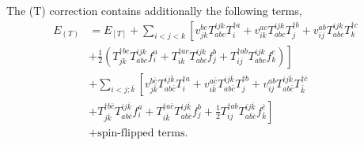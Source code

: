 \documentclass[a4paper,12pt,oneside]{book}
\newcommand{\spa}[1]{{#1}}
\newcommand{\spb}[1]{\bar{#1}}
\newcommand{\half}{\frac{1}{2}}
\begin{document}
The (T) correction contains additionally the following terms,
\begin{equation}
\begin{aligned}
\label{eq:Euccsd(t)}
E_{(T)}&=E_{[T]} 
+ \sum_{\spa{i}\lt\spa{j}\lt\spa{k}}\left[ 
v_{\spa{j}\spa{k}}^{\spa{b}\spa{c}} T_{\spa{a}\spa{b}\spa{c}}^{\spa{i}\spa{j}\spa{k}} T_{\spa{i}}^{\dagger \spa{a}} 
+v_{\spa{i}\spa{k}}^{\spa{a}\spa{c}} T_{\spa{a}\spa{b}\spa{c}}^{\spa{i}\spa{j}\spa{k}} T_{\spa{j}}^{\dagger \spa{b}} 
+v_{\spa{i}\spa{j}}^{\spa{a}\spa{b}} T_{\spa{a}\spa{b}\spa{c}}^{\spa{i}\spa{j}\spa{k}} T_{\spa{k}}^{\dagger \spa{c}} 
\right.\\
&\left.
 + \half\left( T_{\spa{j}\spa{k}}^{\dagger \spa{b}\spa{c}} T_{\spa{a}\spa{b}\spa{c}}^{\spa{i}\spa{j}\spa{k}} f_{\spa{i}}^{\spa{a}}
 + T_{\spa{i}\spa{k}}^{\dagger \spa{a}\spa{c}} T_{\spa{a}\spa{b}\spa{c}}^{\spa{i}\spa{j}\spa{k}} f_{\spa{j}}^{\spa{b}}
 + T_{\spa{i}\spa{j}}^{\dagger \spa{a}\spa{b}} T_{\spa{a}\spa{b}\spa{c}}^{\spa{i}\spa{j}\spa{k}} f_{\spa{k}}^{\spa{c}}
 \right)\right]\\
&+ \sum_{\spa{i}\lt\spa{j}; \spb{k}} \left[
v_{\spa{j}\spb{k}}^{\spa{b}\spb{c}} T_{\spa{a}\spa{b}\spb{c}}^{\spa{i}\spa{j}\spb{k}} T_{\spa{i}}^{\dagger \spa{a}} 
+v_{\spa{i}\spb{k}}^{\spa{a}\spb{c}} T_{\spa{a}\spa{b}\spb{c}}^{\spa{i}\spa{j}\spb{k}} T_{\spa{j}}^{\dagger \spa{b}} 
 + v_{\spa{i}\spa{j}}^{\spa{a}\spa{b}} T_{\spa{a}\spa{b}\spb{c}}^{\spa{i}\spa{j}\spb{k}} T_{\spb{k}}^{\dagger \spb{c}} 
\right.\\
&\left.
 + T_{\spa{j}\spb{k}}^{\dagger \spa{b}\spb{c}} T_{\spa{a}\spa{b}\spb{c}}^{\spa{i}\spa{j}\spb{k}} f_{\spa{i}}^{\spa{a}} 
 + T_{\spa{i}\spb{k}}^{\dagger \spa{a}\spb{c}} T_{\spa{a}\spa{b}\spb{c}}^{\spa{i}\spa{j}\spb{k}} f_{\spa{j}}^{\spa{b}} 
 + \half T_{\spa{i}\spa{j}}^{\dagger \spa{a}\spa{b}} T_{\spa{a}\spa{b}\spb{c}}^{\spa{i}\spa{j}\spb{k}} f_{\spb{k}}^{\spb{c}} 
 \right] \\
 &+ \mbox{spin-flipped terms}.
\end{aligned}
\end{equation}
\end{document}
